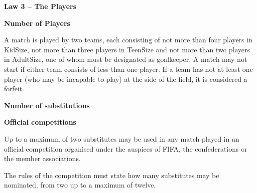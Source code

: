 \clearpage
\sffamily

{\bfseries\color[rgb]{0.4,0.4,0.4}
Law 3 -- The Players}
{}


\bigskip

{\bfseries Number of Players}

\headlinebox

A match is played by two teams, each consisting of not more than four players in KidSize,
not more than three players in TeenSize and not more than two players in AdultSize,
one of whom must be designated as goalkeeper.
A match may not start if either team consists of less than one player.
If a team has not at least one player (who may be incapable to play) at the side of the field,
it is considered a forfeit.


\bigskip

{\bfseries Number of substitutions}

\headlinebox
 
{\bfseries Official competitions }

Up to a maximum of two  substitutes may be used in any match played in an official competition organised under the auspices of FIFA, the confederations or the member associations.

The rules of the competition must state how many substitutes may be nominated, from two  up to a maximum of twelve.

\bigskip


